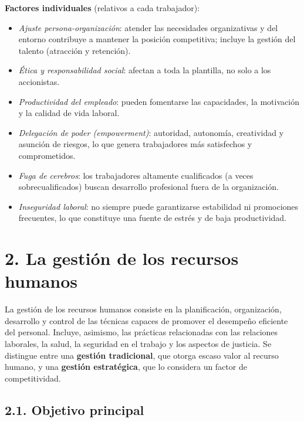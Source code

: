 \documentclass[12pt]{book} %
\providecommand{\tightlist}{%
  \setlength{\itemsep}{0pt}\setlength{\parskip}{0pt}}
\begin{document}
\textbf{Factores individuales} (relativos a cada trabajador):

\begin{itemize}
\tightlist
\item
  \emph{Ajuste persona-organización}: atender las necesidades
  organizativas y del entorno contribuye a mantener la posición
  competitiva; incluye la gestión del talento (atracción y retención).
\item
  \emph{Ética y responsabilidad social}: afectan a toda la plantilla, no
  solo a los accionistas.
\item
  \emph{Productividad del empleado}: pueden fomentarse las capacidades,
  la motivación y la calidad de vida laboral.
\item
  \emph{Delegación de poder (empowerment)}: autoridad, autonomía,
  creatividad y asunción de riesgos, lo que genera trabajadores más
  satisfechos y comprometidos.
\item
  \emph{Fuga de cerebros}: los trabajadores altamente cualificados (a
  veces sobrecualificados) buscan desarrollo profesional fuera de la
  organización.
\item
  \emph{Inseguridad laboral}: no siempre puede garantizarse estabilidad
  ni promociones frecuentes, lo que constituye una fuente de estrés y de
  baja productividad.
\end{itemize}

\hypertarget{la-gestiuxf3n-de-los-recursos-humanos}{%
\section{2. La gestión de los recursos
humanos}\label{la-gestiuxf3n-de-los-recursos-humanos}}

La gestión de los recursos humanos consiste en la planificación,
organización, desarrollo y control de las técnicas capaces de promover
el desempeño eficiente del personal. Incluye, asimismo, las prácticas
relacionadas con las relaciones laborales, la salud, la seguridad en el
trabajo y los aspectos de justicia. Se distingue entre una
\textbf{gestión tradicional}, que otorga escaso valor al recurso humano,
y una \textbf{gestión estratégica}, que lo considera un factor de
competitividad.

\hypertarget{objetivo-principal}{%
\subsection{2.1. Objetivo principal}\label{objetivo-principal}}
\end{document}
